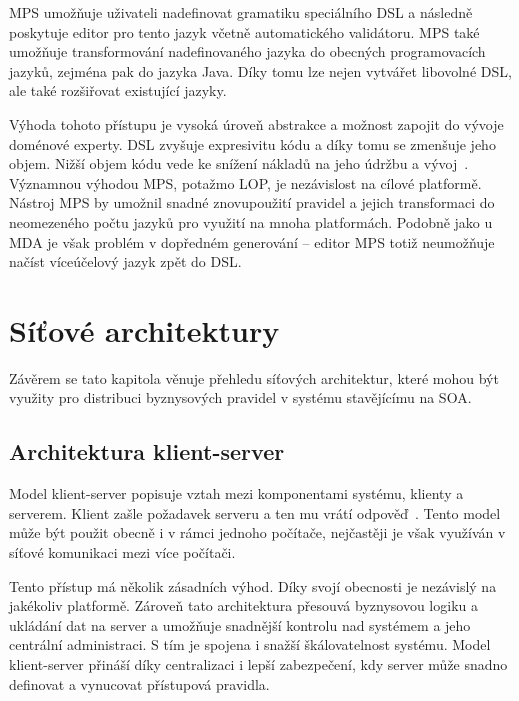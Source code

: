 MPS umožňuje uživateli nadefinovat gramatiku speciálního \gls{DSL} a následně poskytuje
editor pro tento jazyk včetně automatického validátoru. MPS také umožňuje transformování
nadefinovaného jazyka do obecných programovacích jazyků, zejména pak do jazyka Java.
Díky tomu lze nejen vytvářet libovolné \gls{DSL}, ale také rozšiřovat existující jazyky.

Výhoda tohoto přístupu je vysoká úroveň abstrakce a možnost zapojit do vývoje doménové experty.
\gls{DSL} zvyšuje expresivitu kódu a díky tomu se zmenšuje jeho objem.
Nižší objem kódu vede ke snížení nákladů na jeho údržbu a vývoj~\cite{littman1987mental}\cite{soloway1986empirical}.
Významnou výhodou MPS, potažmo \gls{LOP}, je nezávislost na cílové platformě.
Nástroj MPS by umožnil snadné znovupoužití pravidel a jejich transformaci do neomezeného počtu jazyků pro
využití na mnoha platformách. Podobně jako u \gls{MDA} je však problém v dopředném
generování -- editor MPS totiž neumožňuje načíst víceúčelový jazyk zpět do \gls{DSL}.

\section{Síťové architektury}

Závěrem se tato kapitola věnuje přehledu síťových architektur, které mohou být využity pro
distribuci byznysových pravidel v systému stavějícímu na \gls{SOA}.

\subsection{Architektura klient-server}\label{sec:client-server}

Model klient-server popisuje vztah mezi komponentami systému, klienty a serverem.
Klient zašle požadavek serveru a ten mu vrátí odpověď~\cite{berson1992client}.
Tento model může být použit obecně i v rámci jednoho počítače,
nejčastěji je však využíván v síťové komunikaci mezi více počítači.


Tento přístup má několik zásadních výhod. Díky svojí obecnosti je nezávislý
na jakékoliv platformě. Zároveň tato architektura přesouvá byznysovou logiku a
ukládání dat na server a umožňuje snadnější kontrolu nad systémem a jeho centrální
administraci. S tím je spojena i snažší škálovatelnost systému. Model klient-server
přináší díky centralizaci i lepší zabezpečení, kdy server může snadno definovat a
vynucovat přístupová pravidla.

